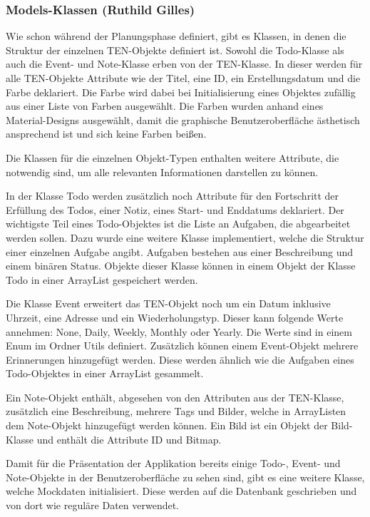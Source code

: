 \subsubsection{Models-Klassen (Ruthild Gilles)}

Wie schon während der Planungsphase definiert, gibt es Klassen, in denen die Struktur der einzelnen TEN-Objekte definiert ist. Sowohl die Todo-Klasse als auch die Event- und Note-Klasse erben von der TEN-Klasse. In dieser werden für alle TEN-Objekte Attribute wie der Titel, eine ID, ein Erstellungsdatum und die Farbe deklariert. Die Farbe wird dabei bei Initialisierung eines Objektes zufällig aus einer Liste von Farben ausgewählt. Die Farben wurden anhand eines Material-Designs ausgewählt, damit die graphische Benutzeroberfläche ästhetisch ansprechend ist und sich keine Farben beißen.

Die Klassen für die einzelnen Objekt-Typen enthalten weitere Attribute, die notwendig sind, um alle relevanten Informationen darstellen zu können.

In der Klasse Todo werden zusätzlich noch Attribute für den Fortschritt der Erfüllung des Todos, einer Notiz, eines Start- und Enddatums deklariert. Der wichtigste Teil eines Todo-Objektes ist die Liste an Aufgaben, die abgearbeitet werden sollen. Dazu wurde eine weitere Klasse implementiert, welche die Struktur einer einzelnen Aufgabe angibt. Aufgaben bestehen aus einer Beschreibung und einem binären Status. Objekte dieser Klasse können in einem Objekt der Klasse Todo in einer ArrayList gespeichert werden.

Die Klasse Event erweitert das TEN-Objekt noch um ein Datum inklusive Uhrzeit, eine Adresse und ein Wiederholungstyp. Dieser kann folgende Werte annehmen: None, Daily, Weekly, Monthly oder Yearly. Die Werte sind in einem Enum im Ordner Utils definiert. Zusätzlich können einem Event-Objekt mehrere Erinnerungen hinzugefügt werden. Diese werden ähnlich wie die Aufgaben eines Todo-Objektes in einer ArrayList gesammelt.

Ein Note-Objekt enthält, abgesehen von den Attributen aus der TEN-Klasse, zusätzlich eine Beschreibung, mehrere Tags und Bilder, welche in ArrayListen dem Note-Objekt hinzugefügt werden können. Ein Bild ist ein Objekt der Bild-Klasse und enthält die Attribute ID und Bitmap.

Damit für die Präsentation der Applikation bereits einige Todo-, Event- und Note-Objekte in der Benutzeroberfläche zu sehen sind, gibt es eine weitere Klasse, welche Mockdaten initialisiert. Diese werden auf die Datenbank geschrieben und von dort wie reguläre Daten verwendet.

